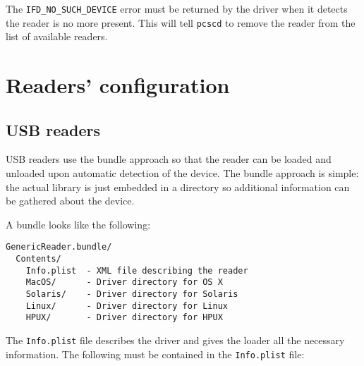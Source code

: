 \documentclass[a4paper,12pt]{article}
\begin{document}
The \texttt{IFD\_NO\_SUCH\_DEVICE} error must be returned by the driver
when it detects the reader is no more present. This will tell
\texttt{pcscd} to remove the reader from the list of available readers.


\section{Readers' configuration}


\subsection{USB readers}

USB readers use the bundle approach so that the reader can be loaded and
unloaded upon automatic detection of the device. The bundle approach is
simple: the actual library is just embedded in a directory so additional
information can be gathered about the device.

A bundle looks like the following:

\begin{verbatim}
GenericReader.bundle/
  Contents/
    Info.plist  - XML file describing the reader
    MacOS/      - Driver directory for OS X
    Solaris/    - Driver directory for Solaris
    Linux/      - Driver directory for Linux
    HPUX/       - Driver directory for HPUX
\end{verbatim}

The \texttt{Info.plist} file describes the driver and gives the loader all
the necessary information. The following must be contained in the
\texttt{Info.plist} file:
\end{document}
